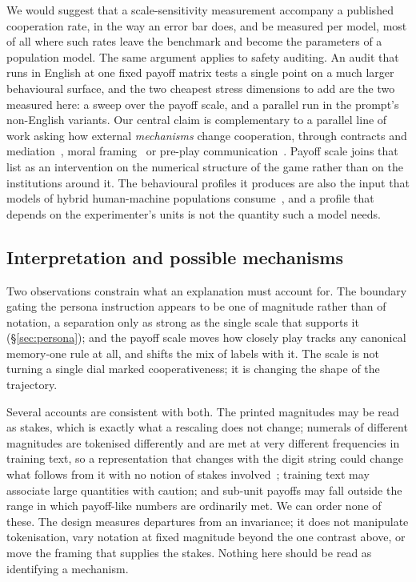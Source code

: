 \documentclass[openacc]{rsproca_new}
\begin{document}
We would suggest that a scale-sensitivity measurement accompany a published
cooperation rate, in the way an error bar does, and be measured per model, most
of all where such rates leave the benchmark and become the parameters of a
population model. The same argument applies to safety auditing. An audit that
runs in English at one fixed payoff matrix tests a single point on a much
larger behavioural surface, and the two cheapest stress dimensions to add are
the two measured here: a sweep over the payoff scale, and a parallel run in the
prompt's non-English variants. Our central claim is complementary to a
parallel line of work asking how external \emph{mechanisms} change cooperation,
through contracts and mediation~\cite{tewolde2026coopeval}, moral
framing~\cite{backmann2025moralsim} or pre-play
communication~\cite{loreheydari2026communication}. Payoff scale joins that list
as an intervention on the numerical structure of the game rather than on the
institutions around it. The behavioural profiles it
produces are also the input that models of hybrid human-machine populations
consume~\cite{han2026social}, and a profile that depends on the experimenter's
units is not the quantity such a model needs.

\subsection{Interpretation and possible mechanisms}\label{sec:disc_mechanisms}

Two observations constrain what an explanation must account for. The boundary
gating the persona instruction appears to be one of magnitude rather than of
notation, a separation only as strong as the single scale that supports it
(\S\ref{sec:persona}); and the payoff scale moves how closely play tracks any
canonical memory-one rule at all, and shifts the mix of labels with it. The
scale is not turning a single dial marked cooperativeness; it is changing the
shape of the trajectory.

Several accounts are consistent with both. The printed magnitudes may be read
as stakes, which is exactly what a rescaling does not change; numerals of
different magnitudes are tokenised differently and are met at very different
frequencies in training text, so a representation that changes with the digit
string could change what follows from it with no notion of stakes
involved~\cite{razeghi2022impact}; training text may associate large quantities
with caution; and sub-unit payoffs may fall outside the range in which
payoff-like numbers are ordinarily met. We can order none of these. The design
measures departures from an invariance; it does not manipulate tokenisation,
vary notation at fixed magnitude beyond the one contrast above, or move the
framing that supplies the stakes. Nothing here should be read as identifying a
mechanism.
\end{document}
